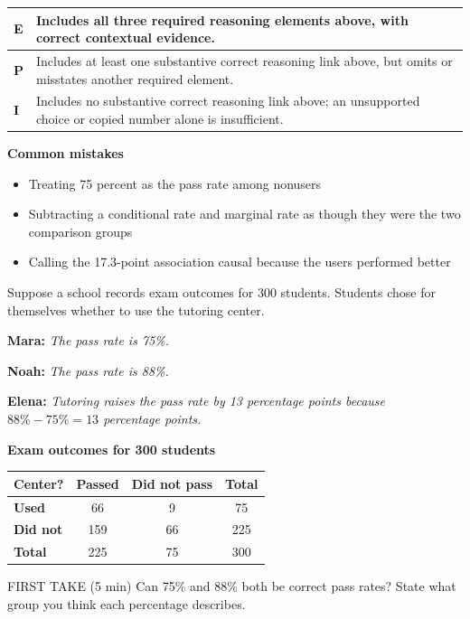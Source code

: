 \documentclass[11pt]{article}
\begin{document}
{\small\renewcommand{\arraystretch}{1.25}
\noindent\begin{tabular}{|p{0.5in}|p{5.9in}|}
\hline
\textbf{E} & Includes all three required reasoning elements above, with correct contextual evidence. \\ \hline
\textbf{P} & Includes at least one substantive correct reasoning link above, but omits or misstates another required element. \\ \hline
\textbf{I} & Includes no substantive correct reasoning link above; an unsupported choice or copied number alone is insufficient. \\ \hline
\end{tabular}}

\textbf{Common mistakes}
\begin{itemize}[leftmargin=1.5em,itemsep=2pt,topsep=2pt]
  \item Treating 75 percent as the pass rate among nonusers
  \item Subtracting a conditional rate and marginal rate as though they were the two comparison groups
  \item Calling the 17.3-point association causal because the users performed better
\end{itemize}

\clearpage
{}

Suppose a school records exam outcomes for 300 students. Students chose for themselves whether to use the tutoring center.\par\smallskip \textbf{Mara:} \emph{The pass rate is 75\%.}\par \textbf{Noah:} \emph{The pass rate is 88\%.}\par \textbf{Elena:} \emph{Tutoring raises the pass rate by 13 percentage points because $88\%-75\%=13$ percentage points.}\par
\begin{center}
\textbf{Exam outcomes for 300 students}\par\smallskip
\begin{tabular}{|l|c|c|c|}
\hline
\textbf{Center?} & \textbf{Passed} & \textbf{Did not pass} & \textbf{Total} \\ \hline
\textbf{Used} & 66 & 9 & 75 \\ \hline
\textbf{Did not} & 159 & 66 & 225 \\ \hline
\textbf{Total} & 225 & 75 & 300 \\ \hline
\end{tabular}
\end{center}
\begin{firsttakebox}{FIRST TAKE (5 min)}
Can 75\% and 88\% both be correct pass rates? State what group you think each percentage describes.\par
{}
\end{firsttakebox}
\end{document}
